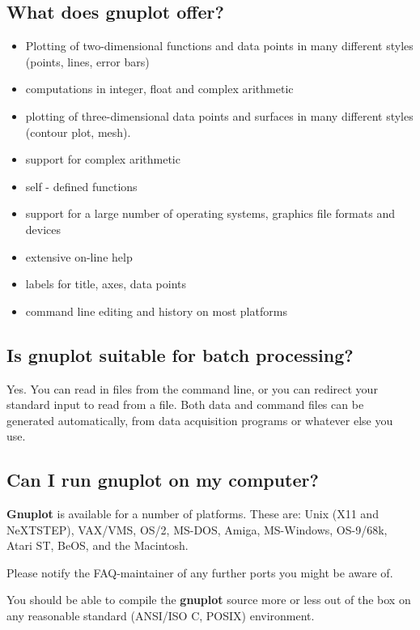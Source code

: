 \documentclass[a4paper,11pt]{article}
\newcommand{\gnuplot}{\textbf{gnuplot}}
\newcommand{\Gnuplot}{\textbf{Gnuplot}}
\begin{document}
\subsection{What does \gnuplot{} offer?}

\begin{itemize}
\item Plotting of two-dimensional functions and data points in many
different styles (points, lines, error bars)
\item computations in integer, float and complex arithmetic
\item plotting of three-dimensional data points and surfaces in
many different styles (contour plot, mesh).
\item support for complex arithmetic
\item self - defined functions
\item support for a large number of operating systems, graphics
file formats and devices
\item extensive on-line help
\item labels for title, axes, data points
\item command line editing and history on most platforms
\end{itemize}

\subsection{Is \gnuplot{} suitable for batch processing?}

Yes. You can read in files from the command line, or you can
redirect your standard input to read from a file. Both data and
command files can be generated automatically, from data
acquisition programs or whatever else you use.

\subsection{Can I run \gnuplot{} on my computer?}

\Gnuplot{} is available for a number of platforms. These are: Unix
(X11 and NeXTSTEP), VAX/VMS, OS/2, MS-DOS, Amiga, MS-Windows,
OS-9/68k, Atari ST, BeOS, and the Macintosh.


Please notify the FAQ-maintainer of any further ports you
might be aware of.

You should be able to compile the \gnuplot{} source more or
less out of the box on any reasonable standard (ANSI/ISO C, POSIX)
environment.
\end{document}
